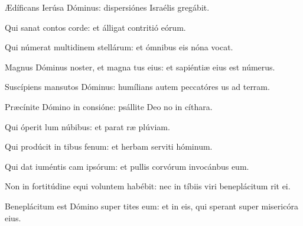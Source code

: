 \item {}

\item Ædíficans Ierúsa Dóminus:\psstar{} dispersiónes Israélis gregábit.

\item Qui sanat contos corde:\psstar{} et álligat contritió eórum.

\item Qui númerat multidinem stellárum:\psstar{} et ómnibus eis nóna vocat.

\item Magnus Dóminus noster, et magna tus eius:\psstar{} et sapiéntiæ eius  est númerus.

\item Suscípiens mansutos Dóminus:\psstar{} humílians autem peccatóres us ad terram.

\item Præcínite Dómino in consióne:\psstar{} psállite Deo no in cíthara.

\item Qui óperit lum núbibus:\psstar{} et parat ræ plúviam.

\item Qui prodúcit in tibus fenum:\psstar{} et herbam serviti hóminum.

\item Qui dat iuméntis cam ipsórum:\psstar{} et pullis corvórum invocánbus eum.

\item Non in fortitúdine equi voluntem habébit:\psstar{} nec in tíbiis viri beneplácitum rit ei.

\item Beneplácitum est Dómino super tites eum:\psstar{} et in eis, qui sperant super misericóra eius.

